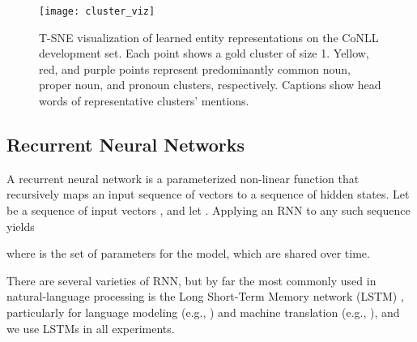 \documentclass[11pt,letterpaper]{article}
\begin{document}
\begin{figure}[t!]
\centering
\texttt{[image: cluster\_viz]}
\caption{T-SNE  visualization of
  learned entity representations on the CoNLL development set. Each point shows a gold cluster of size  1. Yellow, red, and purple points represent predominantly common
  noun, proper noun, and pronoun clusters, respectively. Captions
  show head words of representative clusters' mentions.}
\label{fig:clustviz}
\end{figure}

\subsection{Recurrent Neural Networks}
A recurrent neural network is a parameterized non-linear function  that recursively maps an input sequence of vectors to a sequence of hidden states. 
Let  be a sequence of  input vectors , and let . Applying an RNN to any such sequence yields    

\vspace{-5mm}
{\small

}

\vspace{-5mm}
\noindent where  is the set of parameters for the model, which are shared over time.

There are several varieties of RNN, but by far the most commonly used in natural-language processing is the Long Short-Term Memory network (LSTM)
\cite{hochreiter1997lstm}, particularly for language modeling (e.g., ) and machine
translation (e.g., ), and we use LSTMs in all experiments. 
\end{document}
